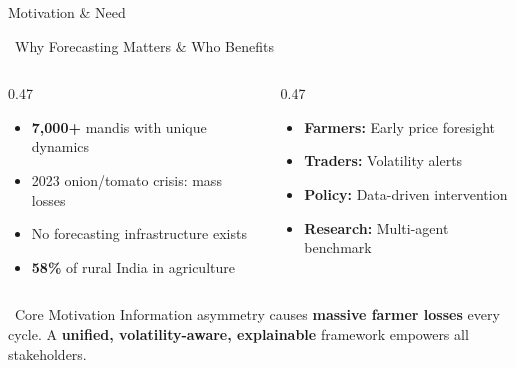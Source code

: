 \documentclass{beamer}
\begin{document}
\begin{frame}[label=motivation]{Motivation \& Need}
\vspace{0.04cm}

\begin{infocard}{~Why Forecasting Matters \& Who Benefits}
\footnotesize
\begin{columns}[T]
\begin{column}{0.47\textwidth}
\begin{itemize}\setlength\itemsep{2pt}
\item \textbf{7,000+} mandis with unique dynamics
\item 2023 onion/tomato crisis: mass losses
\item No forecasting infrastructure exists
\item \textbf{58\%} of rural India in agriculture
\end{itemize}
\end{column}
\begin{column}{0.47\textwidth}
\begin{itemize}\setlength\itemsep{2pt}
\item \textbf{Farmers:} Early price foresight
\item \textbf{Traders:} Volatility alerts
\item \textbf{Policy:} Data-driven intervention
\item \textbf{Research:} Multi-agent benchmark
\end{itemize}
\end{column}
\end{columns}
\end{infocard}

\vspace{0.04cm}

\begin{orangecard}{~Core Motivation}
\footnotesize
Information asymmetry causes \textbf{massive farmer losses} every cycle. A \textbf{unified, volatility-aware, explainable} framework empowers all stakeholders.
\end{orangecard}

\end{frame}
\end{document}
